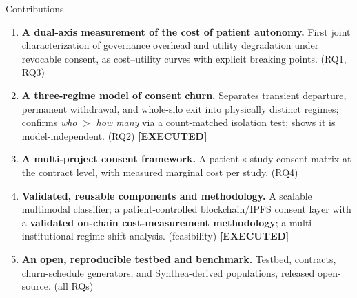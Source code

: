 \documentclass[aspectratio=169, 11pt]{beamer}
\newcommand{\done}{{\color{mTeal}\textbf{[EXECUTED]}}}
\begin{document}
\begin{frame}{Contributions}
\scriptsize
\begin{enumerate}\setlength\itemsep{0.5em}
\item[\textbf{C1}] \textbf{A dual-axis measurement of the cost of patient
  autonomy.} First joint characterization of governance overhead and utility
  degradation under revocable consent, as cost--utility curves with explicit
  breaking points. \hfill{\scriptsize(RQ1, RQ3)}
\item[\textbf{C2}] \textbf{A three-regime model of consent churn.} Separates
  transient departure, permanent withdrawal, and whole-silo exit into
  physically distinct regimes; confirms \emph{who} $>$ \emph{how many} via a
  count-matched isolation test; shows it is model-independent.
  \hfill{\scriptsize(RQ2) \done}
\item[\textbf{C3}] \textbf{A multi-project consent framework.} A
  patient\,$\times$\,study consent matrix at the contract level, with measured
  marginal cost per study. \hfill{\scriptsize(RQ4)}
\item[\textbf{C4}] \textbf{Validated, reusable components and methodology.}
  A scalable multimodal classifier; a patient-controlled blockchain/IPFS
  consent layer with a \textbf{validated on-chain cost-measurement
  methodology}; a multi-institutional regime-shift analysis.
  \hfill{\scriptsize(feasibility) \done}
\item[\textbf{C5}] \textbf{An open, reproducible testbed and benchmark.}
  Testbed, contracts, churn-schedule generators, and Synthea-derived
  populations, released open-source. \hfill{\scriptsize(all RQs)}
\end{enumerate}
\end{frame}
\end{document}
